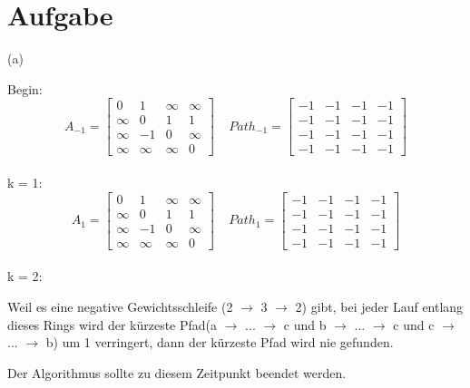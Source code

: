 \documentclass[fleqn]{article}
\begin{document}
\section{Aufgabe}
(a)  

Begin:
$$A_{-1}=\begin{bmatrix}
    0 & 1 & \infty & \infty \\
    \infty & 0 & 1 & 1 \\
    \infty & -1 & 0 & \infty \\
    \infty & \infty & \infty & 0
\end{bmatrix} \ \ \ \ \
Path_{-1}=\begin{bmatrix}
    -1 & -1 & -1 & -1 \\
    -1 & -1 & -1 & -1 \\
    -1 & -1 & -1 & -1 \\
    -1 & -1 & -1 & -1
\end{bmatrix}
$$
\\

k = 1:
$$A_{1}=\begin{bmatrix}
    0 & 1 & \infty & \infty \\
    \infty & 0 & 1 & 1 \\
    \infty & -1 & 0 & \infty \\
    \infty & \infty & \infty & 0
\end{bmatrix} \ \ \ \ \
Path_{1}=\begin{bmatrix}
    -1 & -1 & -1 & -1 \\
    -1 & -1 & -1 & -1 \\
    -1 & -1 & -1 & -1 \\
    -1 & -1 & -1 & -1
\end{bmatrix}
$$
\\

k = 2:

Weil es eine negative Gewichtsschleife (2 $\rightarrow$ 3 $\rightarrow$ 2) gibt, bei jeder Lauf entlang dieses Rings wird der kürzeste Pfad(a $\rightarrow$ ... $\rightarrow$ c und b $\rightarrow$ ... $\rightarrow$ c und c $\rightarrow$ ... $\rightarrow$ b) um 1 verringert, dann der kürzeste Pfad wird nie gefunden.

Der Algorithmus sollte zu diesem Zeitpunkt beendet werden.
\end{document}
